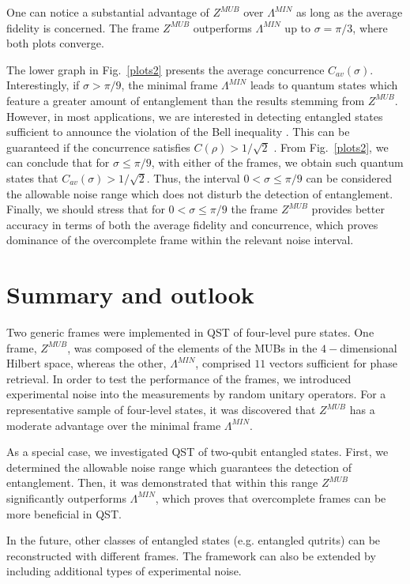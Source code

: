 \documentclass[aps,pra,reprint,groupedaddress,showkeys]{revtex4-1}
\newcommand{\figref}[1]{Fig.~\ref{#1}}
\begin{document}
One can notice a substantial advantage of $Z^{MUB}$ over $\Lambda^{MIN}$ as long as the average fidelity is concerned. The frame $Z^{MUB}$ outperforms $\Lambda^{MIN}$ up to $\sigma = \pi/3$, where both plots converge.

The lower graph in \figref{plots2} presents the average concurrence $C_{av} (\sigma)$. Interestingly, if $\sigma > \pi/9$, the minimal frame $\Lambda^{MIN}$ leads to quantum states which feature a greater amount of entanglement than the results stemming from $Z^{MUB}$. However, in most applications, we are interested in detecting entangled states sufficient to announce the violation of the Bell inequality \cite{Zukowski2002}. This can be guaranteed if the concurrence satisfies $C(\rho) > 1/\sqrt{2}$ \cite{Verstraete2002,Hu2012}. From \figref{plots2}, we can conclude that for $\sigma \leq \pi/9$, with either of the frames, we obtain such quantum states that $C_{av} (\sigma) > 1/\sqrt{2}$. Thus, the interval $0<\sigma \leq \pi/9$ can be considered the allowable noise range which does not disturb the detection of entanglement. Finally, we should stress that for $0<\sigma \leq \pi/9$ the frame $Z^{MUB}$ provides better accuracy in terms of both the average fidelity and concurrence, which proves dominance of the overcomplete frame within the relevant noise interval.

\section{Summary and outlook}

Two generic frames were implemented in QST of four-level pure states. One frame, $Z^{MUB}$, was composed of the elements of the MUBs in the $4-$dimensional Hilbert space, whereas the other, $\Lambda^{MIN}$, comprised $11$ vectors sufficient for phase retrieval. In order to test the performance of the frames, we introduced experimental noise into the measurements by random unitary operators. For a representative sample of four-level states, it was discovered that $Z^{MUB}$ has a moderate advantage over the minimal frame $\Lambda^{MIN}$.

As a special case, we investigated QST of two-qubit entangled states. First, we determined the allowable noise range which guarantees the detection of entanglement. Then, it was demonstrated that within this range $Z^{MUB}$ significantly outperforms $\Lambda^{MIN}$, which proves that overcomplete frames can be more beneficial in QST.

In the future, other classes of entangled states (e.g. entangled qutrits) can be reconstructed with different frames. The framework can also be extended by including additional types of experimental noise. 
\end{document}
